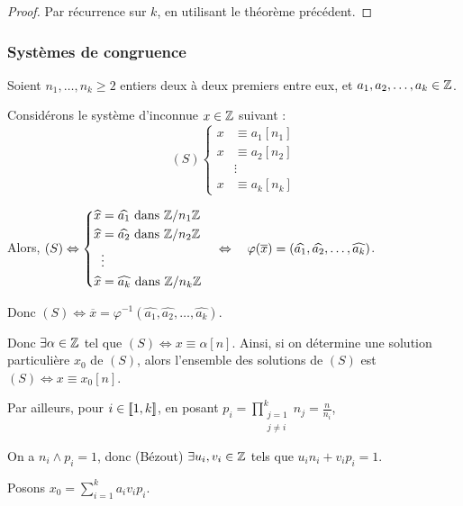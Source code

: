 \begin{proof}
    Par récurrence sur $k$, en utilisant le théorème précédent.
\end{proof}

\subsubsection{Systèmes de congruence }

Soient $n_1, \ldots, n_k \geqslant 2$ entiers deux à deux premiers entre eux, et 
$a_1, a_2, \ldots, a_k \in \mathbb{Z}$.

Considérons le système d'inconnue $x \in \mathbb{Z}$ suivant :
\[
    (S) \left\{ 
        \begin{aligned}
            x & \equiv a_1 [n_1] \\
            x & \equiv a_2 [n_2] \\
            & \vdots \\
            x & \equiv a_k [n_k]
        \end{aligned}
    \right.
\] 

Alors, $(S) \Leftrightarrow \left\{ 
    \begin{aligned}
        \widehat x & = \widehat{a_1} \text{ dans } \mathbb{Z} / n_1 \mathbb{Z} \\
        \widehat x & = \widehat{a_2} \text{ dans } \mathbb{Z} / n_2 \mathbb{Z} \\
        & \vdots \\
        \widehat x & = \widehat{a_k} \text{ dans } \mathbb{Z} / n_k \mathbb{Z}
    \end{aligned} \right. \quad \Leftrightarrow  \quad\varphi(\overline x) = (\widehat{a_1}, \widehat{a_2}, \ldots, \widehat{a_k})$.

Donc $(S) \Leftrightarrow \overline x = \varphi^{-1}(\widehat{a_1}, \widehat{a_2}, \ldots, \widehat{a_k})$.

Donc $\exists \alpha \in \mathbb{Z}$ tel que $(S) \Leftrightarrow x \equiv \alpha [n]$. Ainsi, si on détermine 
une solution particulière $x_0$ de $(S)$, alors l'ensemble des solutions de $(S)$ est 
$(S) \Leftrightarrow x \equiv x_0 [n]$.

Par ailleurs, pour $i \in [\![1, k]\!]$, en posant $\displaystyle p_i = \prod_{\substack{j = 1 \\ j \neq i}}^k n_j = \frac n {n_i}$,

On a $n_i \wedge p_i = 1$, donc (Bézout) $\exists u_i, v_i \in \mathbb{Z}$ tels que $u_i n_i + v_i p_i = 1$.

Posons $x_0 = \displaystyle \sum_{i = 1}^k a_i v_i p_i$.


